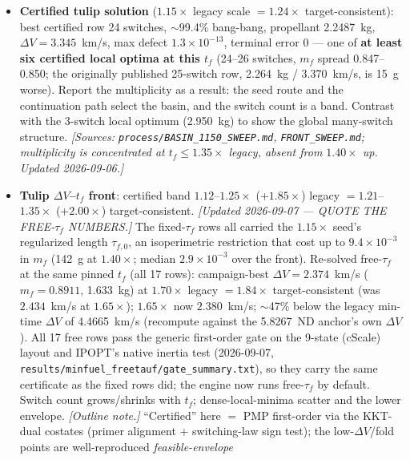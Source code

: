 \documentclass[11pt]{article}
\begin{document}
\begin{itemize}
  \item \textbf{Certified tulip solution} ($1.15\times$ legacy scale $=1.24\times$
        target-consistent): best certified row 24 switches, $\sim$99.4\%
        bang-bang, propellant 2.2487~kg, $\Delta V=3.345$~km/s, max defect
        $1.3\times10^{-13}$, terminal error 0 --- one of \textbf{at least six
        certified local optima at this $t_f$} (24--26 switches, $m_f$ spread
        0.847--0.850; the originally published 25-switch row, 2.264~kg /
        3.370~km/s, is 15~g worse). Report the multiplicity as a result: the
        seed route and the continuation path select the basin, and the switch
        count is a band. Contrast with the 3-switch local optimum (2.950~kg) to
        show the global many-switch structure. \emph{[Sources:
        \texttt{process/BASIN\_1150\_SWEEP.md}, \texttt{FRONT\_SWEEP.md};
        multiplicity is concentrated at $t_f\le1.35\times$ legacy, absent from
        $1.40\times$ up. Updated 2026-09-06.]}
    \item \textbf{Tulip $\Delta V$--$t_f$ front}: certified band $1.12$--$1.25\times$
        (+$1.85\times$) legacy $=1.21$--$1.35\times$ (+$2.00\times$)
        target-consistent. \emph{[Updated 2026-09-07 --- QUOTE THE FREE-$\tau_f$
        NUMBERS.]} The fixed-$\tau_f$ rows all carried the $1.15\times$ seed's
        regularized length $\tau_{f,0}$, an isoperimetric restriction that
        cost up to $9.4\times10^{-3}$ in $m_f$ (142~g at $1.40\times$; median
        $2.9\times10^{-3}$ over the front). Re-solved free-$\tau_f$ at the same
        pinned $t_f$ (all 17 rows): campaign-best
        $\Delta V=2.374$~km/s ($m_f=0.8911$, 1.633~kg) at $1.70\times$ legacy
        $=1.84\times$ target-consistent (was $2.434$~km/s at $1.65\times$);
        $1.65\times$ now $2.380$~km/s; $\sim$47\% below the legacy min-time
        $\Delta V$ of 4.4665~km/s (recompute against the 5.8267~ND anchor's own
        $\Delta V$). All 17 free rows pass the generic first-order gate on the
        9-state (cScale) layout and IPOPT's native inertia test (2026-09-07,
        \texttt{results/minfuel\_freetauf/gate\_summary.txt}), so they carry
        the same certificate as the fixed rows did; the engine now runs
        free-$\tau_f$ by default. Switch count grows/shrinks with
        $t_f$; dense-local-minima scatter and the lower envelope.
        \emph{[Outline note.]} ``Certified'' here $=$ PMP first-order via the
        KKT-dual costates (primer alignment + switching-law sign test); the
        low-$\Delta V$/fold points are well-reproduced \emph{feasible-envelope}

\end{itemize}
\end{document}
